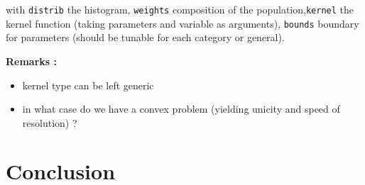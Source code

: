 with \texttt{distrib} the histogram, \texttt{weights} composition of the population,\texttt{kernel} the kernel function (taking parameters and variable as arguments), \texttt{bounds} boundary for parameters (should be tunable for each category or general).

\medskip

\textbf{Remarks :}
\begin{itemize}
\item kernel type can be left generic
\item in what case do we have a convex problem (yielding unicity and speed of resolution) ?
\end{itemize}









\section{Conclusion}








 













